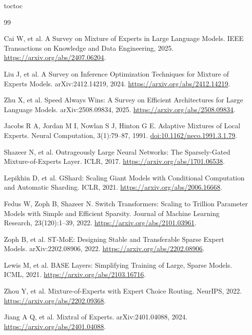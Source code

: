 \documentclass[10pt,a4paper,fontset=none]{ctexart}
\let\BilingualOriginalAddContentsLine\addcontentsline
\def\BilingualTocExtension{entoc}
\renewcommand{\addcontentsline}[3]{%
  \def\BilingualRequestedExtension{#1}%
  \def\BilingualStandardToc{toc}%
  \ifx\BilingualRequestedExtension\BilingualStandardToc
    \BilingualOriginalAddContentsLine{\BilingualTocExtension}{#2}{#3}%
  \else
    \BilingualOriginalAddContentsLine{#1}{#2}{#3}%
  \fi
}
\begin{document}
\clearpage
{}
\begin{thebibliography}{99}
\small
\setlength{\itemsep}{1pt}
\raggedright

Cai W, et al. A Survey on Mixture of Experts in Large Language Models. IEEE Transactions on Knowledge and Data Engineering, 2025. \url{https://arxiv.org/abs/2407.06204}.

Liu J, et al. A Survey on Inference Optimization Techniques for Mixture of Experts Models. arXiv:2412.14219, 2024. \url{https://arxiv.org/abs/2412.14219}.

Zhu X, et al. Speed Always Wins: A Survey on Efficient Architectures for Large Language Models. arXiv:2508.09834, 2025. \url{https://arxiv.org/abs/2508.09834}.

Jacobs R A, Jordan M I, Nowlan S J, Hinton G E. Adaptive Mixtures of Local Experts. Neural Computation, 3(1):79--87, 1991. \href{https://doi.org/10.1162/neco.1991.3.1.79}{doi:10.1162/neco.1991.3.1.79}.

Shazeer N, et al. Outrageously Large Neural Networks: The Sparsely-Gated Mixture-of-Experts Layer. ICLR, 2017. \url{https://arxiv.org/abs/1701.06538}.

Lepikhin D, et al. GShard: Scaling Giant Models with Conditional Computation and Automatic Sharding. ICLR, 2021. \url{https://arxiv.org/abs/2006.16668}.

Fedus W, Zoph B, Shazeer N. Switch Transformers: Scaling to Trillion Parameter Models with Simple and Efficient Sparsity. Journal of Machine Learning Research, 23(120):1--39, 2022. \url{https://arxiv.org/abs/2101.03961}.

Zoph B, et al. ST-MoE: Designing Stable and Transferable Sparse Expert Models. arXiv:2202.08906, 2022. \url{https://arxiv.org/abs/2202.08906}.

Lewis M, et al. BASE Layers: Simplifying Training of Large, Sparse Models. ICML, 2021. \url{https://arxiv.org/abs/2103.16716}.

Zhou Y, et al. Mixture-of-Experts with Expert Choice Routing. NeurIPS, 2022. \url{https://arxiv.org/abs/2202.09368}.

Jiang A Q, et al. Mixtral of Experts. arXiv:2401.04088, 2024. \url{https://arxiv.org/abs/2401.04088}.


\end{thebibliography}
\end{document}
